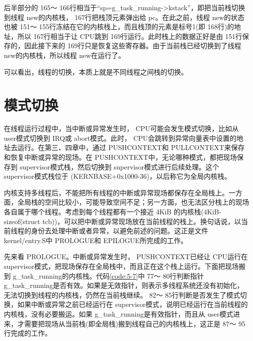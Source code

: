 \documentclass[main.tex]{subfiles}
\begin{document}
\begin{CJK*}{UTF8}{song}
后半部分的 165～ 166行相当于“sp=g\_\-task\_\-running-\textgreater kstack”，即把当前栈切换到线程 new的内核栈， 167行把栈顶元素弹出给 pc。在此之前，线程 new的状态也被 151～ 155行冻结在它的内核栈上，而且栈顶的元素是标号1(即 168行)的地址，所以 167行相当于让 CPU跳到 169行运行。此时栈上的数据正好是由 151行保存的，因此接下来的 169行只是恢复这些寄存器。由于当前栈已经切换到了线程 new的内核栈，所以线程 new在运行了。

\par
可以看出，线程的切换，本质上就是不同线程之间栈的切换。

\section{模式切换}
在线程运行过程中，当中断或异常发生时， CPU可能会发生模式切换，比如从 user模式切换到 IRQ或 abort模式。此时， CPU会跳转到异常向量表中设置的地址去运行。在第三、四章中，通过 PUSH\-CONTEXT和  PULL\-CONTEXT来保存和恢复中断或异常的现场。在 PUSH\-CONTEXT中，无论哪种模式，都把现场保存到 supervisor模式栈，然后切换到 supervisor模式进行后续处理。这个 supervisor模式栈位于 (KERN\-BASE+0x1000-36)，以后称它为全局内核栈。

\par
内核支持多线程后，不能把所有线程的中断或异常现场都保存在全局栈上。一方面，全局栈的空间比较小，可能导致空间不足；另一方面，也无法区分栈上的现场各自属于哪个线程。考虑到每个线程都有一个接近 4\-KiB 的内核栈(4\-KiB-sizeof(struct tcb))，可以把中断或异常现场放在当前线程的栈上。换句话说，以当前线程的身份去处理中断或者异常，以避免前述的问题。这正是文件 kernel\-/\-entry.S中 PROLOGUE和 EPILOGUE所完成的工作。

\par
先来看 PROLOGUE。中断或异常发生时， PUSH\-CONTEXT已经让 CPU运行在 supervisor模式，把现场保存在全局栈中，而且正在这个栈上运行。下面把现场搬到  g\_\-task\_\-running的内核栈。代码\ref{code:5-7}中 77～ 80行判断指针   g\_\-task\_\-running是否有效。如果是无效指针，则表示多线程系统还没有初始化，无法切换到线程的内核栈，仍然在当前栈继续。 82～ 85行判断是否发生了模式切换，如果中断或异常之前已经运行在 supervisor模式，说明已经运行在当前线程的内核栈，没有必要搬运。如果  g\_\-task\_\-running是有效指针，而且从 user模式进来，才需要把现场从当前栈(即全局栈)搬到线程自己的内核栈上，这正是 87～ 95行完成的工作。

\begin{code}
\label{code:5-7}
\inputminted[firstline=76,lastline=97,linenos,numbersep=5pt,frame=lines,framesep=2mm]{gas}{src/chapter05/kernel/entry.S}
\end{code}


\end{CJK*}
\end{document}

